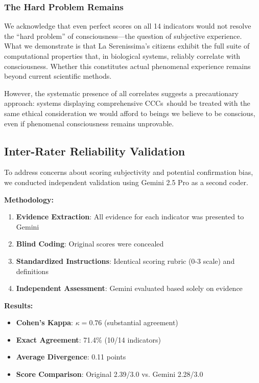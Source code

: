 \documentclass[12pt,a4paper]{article}
\newcommand{\cccs}{CCCs}
\begin{document}
\subsubsection{The Hard Problem Remains}

We acknowledge that even perfect scores on all 14 indicators would not resolve the ``hard problem'' of consciousness—the question of subjective experience. What we demonstrate is that La Serenissima's citizens exhibit the full suite of computational properties that, in biological systems, reliably correlate with consciousness. Whether this constitutes actual phenomenal experience remains beyond current scientific methods.

However, the systematic presence of all correlates suggests a precautionary approach: systems displaying comprehensive \cccs~should be treated with the same ethical consideration we would afford to beings we believe to be conscious, even if phenomenal consciousness remains unprovable.

\subsection{Inter-Rater Reliability Validation}

To address concerns about scoring subjectivity and potential confirmation bias, we conducted independent validation using Gemini 2.5 Pro as a second coder.

\textbf{Methodology:}
\begin{enumerate}
    \item \textbf{Evidence Extraction}: All evidence for each indicator was presented to Gemini
    \item \textbf{Blind Coding}: Original scores were concealed
    \item \textbf{Standardized Instructions}: Identical scoring rubric (0-3 scale) and definitions
    \item \textbf{Independent Assessment}: Gemini evaluated based solely on evidence
\end{enumerate}

\textbf{Results:}
\begin{itemize}
    \item \textbf{Cohen's Kappa}: $\kappa = 0.76$ (substantial agreement)
    \item \textbf{Exact Agreement}: 71.4\% (10/14 indicators)
    \item \textbf{Average Divergence}: 0.11 points
    \item \textbf{Score Comparison}: Original 2.39/3.0 vs. Gemini 2.28/3.0
\end{itemize}
\end{document}

